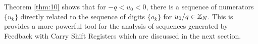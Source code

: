 
\par Theorem \ref{thm:10} shows that for $-q<u_0<0$, there is a sequence of
numerators $\{u_k\}$ directly related to the sequence of digits $\{a_k\}$
for $u_0/q\in\mathbb{Z}_N$. This is provides a more powerful tool for the analysis
of sequences generated by Feedback with Carry Shift Registers which are
discussed in the next section.

